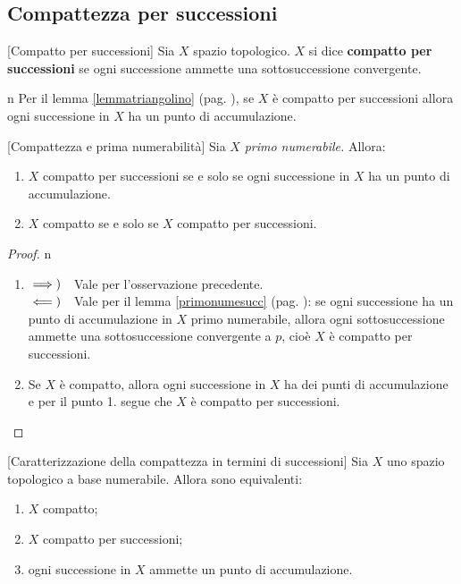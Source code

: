 \subsection{Compattezza per successioni}
\begin{definition}{}[Compatto per successioni]
Sia $X$ spazio topologico. $X$ si dice \textbf{compatto per successioni} se ogni successione ammette una sottosuccessione convergente.
\end{definition}
\begin{remark}{n}
Per il lemma \ref{lemmatriangolino} (pag. \pageref{lemmatriangolino}), se $X$ è compatto per successioni allora ogni successione in $X$ ha un punto di accumulazione.
\end{remark}
\begin{lemma}{}[Compattezza e prima numerabilità]
	Sia $X$ \textit{primo numerabile.} Allora:
\begin{enumerate}
	\item $X$ compatto per successioni se e solo se ogni successione in $X$ ha un punto di accumulazione.
	\item $X$ compatto se e solo se $X$ compatto per successioni.
\end{enumerate}
\end{lemma}
\begin{proof}{n}~{}
\begin{enumerate}[label=\Roman*]
\item$\implies)\quad$Vale per l'osservazione precedente.\\
$\impliedby)\quad$Vale per il lemma \ref{primonumesucc} (pag. \pageref{primonumesucc}): se ogni successione ha un punto di accumulazione in $X$ primo numerabile, allora ogni sottosuccessione ammette una sottosuccessione convergente a $p$, cioè $X$ è compatto per successioni.
\item Se $X$ è compatto, allora ogni successione in $X$ ha dei punti di accumulazione e per il punto 1. segue che $X$ è compatto per successioni.\qedhere
\end{enumerate}
\end{proof}
\begin{proposition}{}[Caratterizzazione della compattezza in termini di successioni]
	Sia $X$ uno spazio topologico a base numerabile. Allora sono equivalenti:
	\begin{enumerate}
		\item $X$ compatto;
		\item $X$ compatto per successioni;
		\item ogni successione in $X$ ammette un punto di accumulazione.
	\end{enumerate}
\end{proposition}
